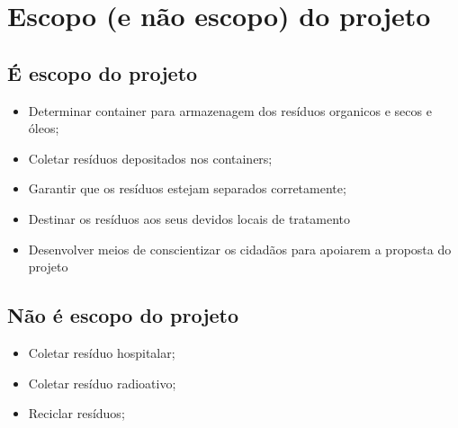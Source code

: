 \section{Escopo (e não escopo) do projeto}

  \subsection{É escopo do projeto}

    \begin{itemize}
      \item Determinar container para armazenagem dos resíduos organicos e secos e óleos;
      \item Coletar resíduos depositados nos containers;
      \item Garantir que os resíduos estejam separados corretamente;
      \item Destinar os resíduos aos seus devidos locais de tratamento
      \item Desenvolver meios de conscientizar os cidadãos para apoiarem a proposta do projeto
    \end{itemize}

  \subsection{Não é escopo do projeto}

  \begin{itemize}
    \item Coletar resíduo hospitalar;
    \item Coletar resíduo radioativo;
    \item Reciclar resíduos;
  \end{itemize}
